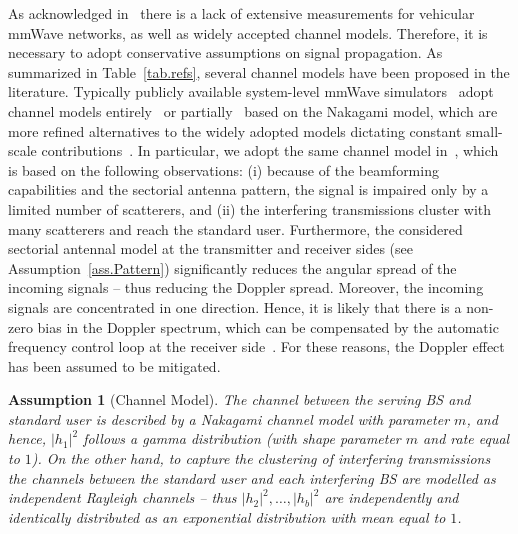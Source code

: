 \documentclass[10pt,journal,a4paper]{IEEEtran}
\newtheorem{assumption}{Assumption}[section]
\begin{document}
As acknowledged in~\cite{RR0} there is a lack of extensive measurements for vehicular mmWave networks, as well as widely accepted channel models. Therefore, it is necessary to adopt conservative assumptions on signal propagation.
As summarized in Table~\ref{tab.refs}, several channel models have been proposed in the literature. 
Typically publicly available system-level mmWave simulators~\cite{ns3mmw} adopt channel models entirely~\cite{6932503} or partially~\cite{7370940} based on the Nakagami model, which are more refined alternatives to the widely adopted models dictating constant small-scale contributions~\cite{C1,C2,7105406}. In particular, we adopt the same channel model in~\cite{7370940}, which is based on the following observations: (i) because of the beamforming capabilities and the sectorial antenna pattern, the signal is impaired only by a limited number of scatterers, and (ii) the interfering transmissions cluster with many scatterers and reach the standard user. Furthermore, the considered sectorial antennal model at the transmitter and receiver sides (see Assumption~\ref{ass.Pattern}) significantly reduces the angular spread of the incoming signals -- thus reducing the Doppler spread. Moreover, the incoming signals are concentrated in one direction. Hence, it is likely that there is a non-zero bias in the Doppler spectrum, which can be compensated by the automatic frequency control loop at the receiver side~\cite{5783993}. For these reasons, the Doppler effect has been assumed to be mitigated.
\begin{assumption}[Channel Model]\label{ass.ch}
The channel between the serving BS and standard user is described by a Nakagami channel model with parameter $m$, and hence, $|h_1|^2$ follows a gamma distribution (with shape parameter $m$ and rate equal to $1$). On the other hand, to capture the clustering of interfering transmissions the channels between the standard user and each interfering BS are modelled as independent Rayleigh channels -- thus $|h_2|^2, \ldots, |h_b|^2$ are independently and identically distributed as an exponential distribution with mean equal to $1$.
\end{assumption}
\end{document}
